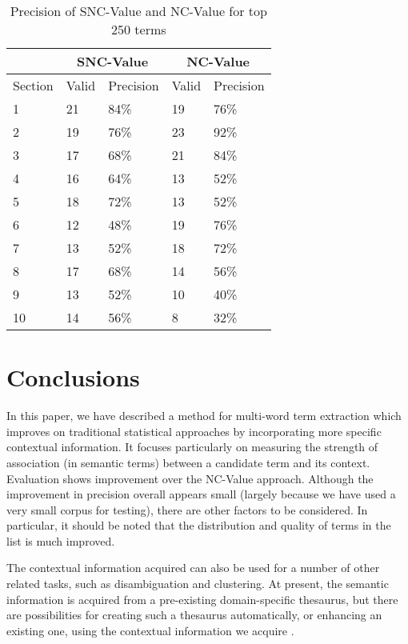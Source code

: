 \begin{table}
\begin{center}
\begin{tabular}{|l|l|l|l|l|}
\hline
& \multicolumn{2}{c|}{SNC-Value} & \multicolumn{2}{c|}{NC-Value}\\
\hline
Section & Valid & Precision & Valid & Precision\\
\hline
1 & 21 & 84\% & 19 & 76\% \\ 
2 & 19 & 76\% & 23 & 92\% \\ 
3 & 17 & 68\% & 21 & 84\% \\
4 & 16 & 64\% & 13 & 52\% \\
5 & 18 & 72\% & 13 & 52\% \\
6 & 12 & 48\% & 19 & 76\% \\
7 & 13 & 52\% & 18 & 72\% \\
8 & 17 & 68\% & 14 & 56\% \\
9 & 13 & 52\% & 10 & 40\% \\
10 & 14 & 56\% & 8 & 32\% \\
\hline
\end{tabular}
\end{center}
\caption{Precision of SNC-Value and NC-Value for top 250 terms}
\label{table:precision-250}
\end{table}

\section{Conclusions}
In this paper, we have described a method for multi-word term
extraction which improves on traditional statistical approaches by
incorporating more specific contextual information. It focuses
particularly on measuring the strength of association (in semantic
terms) between a candidate term and its context. Evaluation shows
improvement over the NC-Value approach. Although the improvement in
precision overall appears
small (largely because we have used a very small corpus for
testing), there are other factors to be considered. In particular, it
should be noted that the distribution and quality of terms in the list
is much improved.

The contextual information acquired can also be used for a number of
other related tasks, such as disambiguation and clustering. At
present, the semantic information is acquired from a pre-existing
domain-specific thesaurus, but there are possibilities for creating
such a thesaurus automatically, or enhancing an existing one, using
the contextual information we acquire \cite{Ushioda96,Maynard99c}.

